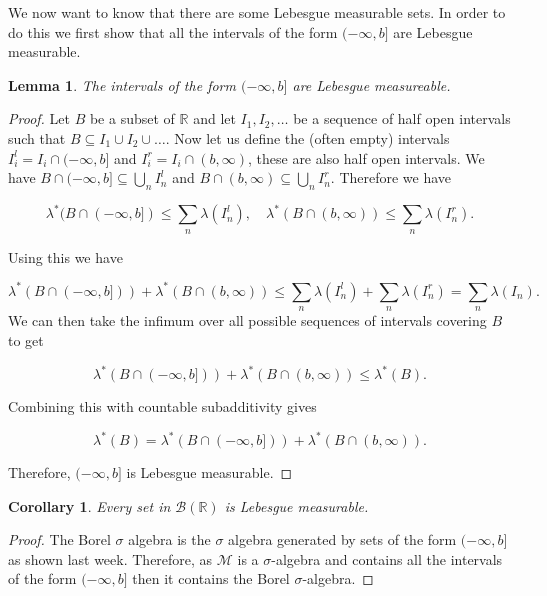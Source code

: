 \documentclass[
]{book}
\newtheorem{lemma}{Lemma}[chapter]
\newtheorem{corollary}{Corollary}[chapter]
\theoremstyle{definition}
\theoremstyle{definition}
\theoremstyle{definition}
\theoremstyle{definition}
\theoremstyle{remark}
\begin{document}
We now want to know that there are some Lebesgue measurable sets. In order to do this we first show that all the intervals of the form \((-\infty, b]\) are Lebesgue measurable.

\begin{lemma}
The intervals of the form \((-\infty, b]\) are Lebesgue measureable.
\end{lemma}

\begin{proof}
Let \(B\) be a subset of \(\mathbb{R}\) and let \(I_1, I_2, \dots\) be a sequence of half open intervals such that \(B \subseteq I_1 \cup I_2 \cup \dots\). Now let us define the (often empty) intervals \(I^l_i = I_i \cap (-\infty, b]\) and \(I^r_i = I_i \cap (b, \infty)\), these are also half open intervals. We have \(B \cap (-\infty,b] \subseteq \bigcup_n I^l_n\) and \(B \cap (b,\infty) \subseteq \bigcup_n I^r_n\). Therefore we have

\[ \lambda^*(B \cap (-\infty, b]) \leq \sum_n \lambda(I^l_n), \quad \lambda^*(B \cap (b,\infty)) \leq \sum_n \lambda(I^r_n). \]

Using this we have

\[ \lambda^*(B \cap(-\infty,b])) + \lambda^*(B \cap (b,\infty)) \leq \sum_n \lambda(I^l_n) + \sum_n \lambda(I^r_n) = \sum_n \lambda(I_n).\]
We can then take the infimum over all possible sequences of intervals covering \(B\) to get

\[ \lambda^*(B \cap(-\infty,b])) + \lambda^*(B \cap (b,\infty)) \leq \lambda^*(B). \]

Combining this with countable subadditivity gives

\[ \lambda^*(B) = \lambda^*(B \cap(-\infty,b])) + \lambda^*(B \cap (b,\infty)). \]

Therefore, \((-\infty,b]\) is Lebesgue measurable.
\end{proof}

\begin{corollary}
Every set in \(\mathcal{B}(\mathbb{R})\) is Lebesgue measurable.
\end{corollary}

\begin{proof}
The Borel \(\sigma\) algebra is the \(\sigma\) algebra generated by sets of the form \((-\infty, b]\) as shown last week. Therefore, as \(\mathscr{M}\) is a \(\sigma\)-algebra and contains all the intervals of the form \((-\infty, b]\) then it contains the Borel \(\sigma\)-algebra.
\end{proof}
\end{document}
